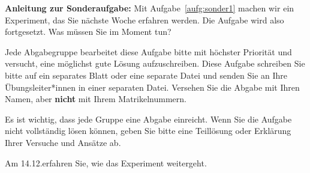 \bigskip


\noindent
\textbf{Anleitung zur Sonderaufgabe:} Mit Aufgabe~\ref{aufg:sonder1} machen wir ein Experiment, das Sie n\"achste Woche erfahren werden. Die Aufgabe wird also fortgesetzt. Was m\"ussen Sie im Moment tun?

Jede Abgabegruppe bearbeitet diese Aufgabe bitte mit h\"ochster Priorit\"at und versucht, eine m\"oglichst gute L\"osung aufzuschreiben. Diese Aufgabe schreiben Sie bitte auf ein separates Blatt oder eine separate Datei und senden Sie an Ihre \"Ubungsleiter*innen in einer separaten Datei. Versehen Sie die Abgabe mit Ihren Namen, aber \textbf{nicht} mit Ihrem Matrikelnummern. 

Es ist wichtig, dass jede Gruppe eine Abgabe einreicht. Wenn Sie die Aufgabe nicht vollst\"andig l\"osen k\"onnen, geben Sie bitte eine Teill\"osung oder Erkl\"arung Ihrer Versuche und Ans\"atze ab.

Am 14.12.\@ erfahren Sie, wie das Experiment weitergeht.

